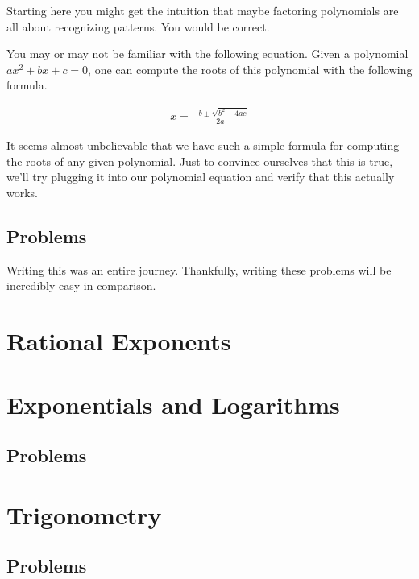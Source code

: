\documentclass{scrbook}
\theoremstyle{definition}
\begin{document}
Starting here you might get the intuition that maybe factoring polynomials are all about recognizing patterns. You would be correct. 

You may or may not be familiar with the following equation. Given a polynomial $ax^2 + bx + c = 0$, one can compute the roots of this polynomial with the following formula.

\begin{align*}
  x = \frac{-b \pm \sqrt{b^2 - 4ac}}{2a}
\end{align*}

It seems almost unbelievable that we have such a simple formula for computing the roots of any given polynomial. Just to convince ourselves that this is true, we'll try plugging it into our polynomial equation and verify that this actually works.



\subsection{Problems}

Writing this was an entire journey. Thankfully, writing these problems will be incredibly easy in comparison. 

\section{Rational Exponents}

\section{Exponentials and Logarithms}

\subsection{Problems}

\section{Trigonometry}

\subsection{Problems}

\printbibliography
\end{document}
